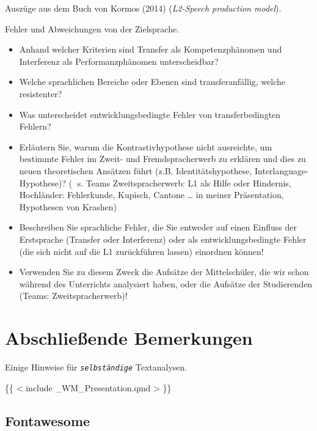 \documentclass[
  letterpaper,
]{scrbook}
\begin{document}
Auszüge aus dem Buch von Kormos (2014) (\emph{L2-Speech production
model}).

Fehler und Abweichungen von der Zielsprache.

\begin{itemize}
\item
  Anhand welcher Kriterien sind Transfer als Kompetenzphänomen und
  Interferenz als Performanzphänomen unterscheidbar?
\item
  Welche sprachlichen Bereiche oder Ebenen sind transferanfällig, welche
  resistenter?
\item
  Was unterscheidet entwicklungsbedingte Fehler von transferbedingten
  Fehlern?
\item
  Erläutern Sie, warum die Kontrastivhypothese nicht ausreichte, um
  bestimmte Fehler im Zweit- und Fremdspracherwerb zu erklären und dies
  zu neuen theoretischen Ansätzen führt (z.B. Identitätshypothese,
  Interlanguage-Hypothese)? ( s. Teams Zweitspracherwerb: L1 als Hilfe
  oder Hindernis, Hochländer: Fehlerkunde, Kupisch, Cantone \ldots{} in
  meiner Präsentation, Hypothesen von Krashen)
\item
  Beschreiben Sie sprachliche Fehler, die Sie entweder auf einen
  Einfluss der Erstsprache (Transfer oder Interferenz) oder als
  entwicklungsbedingte Fehler (die sich nicht auf die L1 zurückführen
  lassen) einordnen können!
\item
  Verwenden Sie zu diesem Zweck die Aufsätze der Mittelschüler, die wir
  schon während des Unterrichts analysiert haben, oder die Aufsätze der
  Studierenden (Teams: Zweitspracherwerb)!
\end{itemize}


\hypertarget{abschlieuxdfende-bemerkungen}{%
\chapter{Abschließende Bemerkungen}\label{abschlieuxdfende-bemerkungen}}

Einige Hinweise für \emph{\texttt{selbständige}} Textanalysen. 🤗

\{\{ \textless{} include \_WM\_Presentation.qmd \textgreater{} \}\}

\hypertarget{fontawesome}{%
\section{Fontawesome}\label{fontawesome}}
\end{document}

